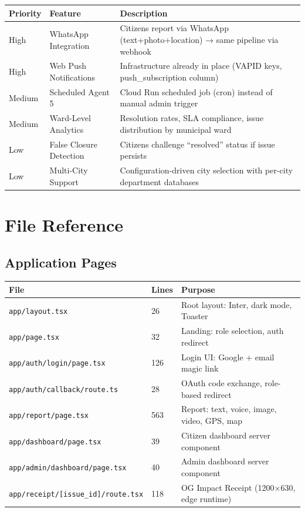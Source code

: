 \documentclass[11pt,a4paper]{article}
\newcommand{\thead}[1]{{\color{white}\bfseries\sffamily #1}}
\newcommand{\file}[1]{\texttt{\footnotesize\color{cpgray}#1}}
\begin{document}
\begin{tabular}{@{} L{2cm} L{4cm} L{8cm} @{}}
\toprule
{}
\thead{Priority} & \thead{Feature} & \thead{Description} \\
\midrule
High   & WhatsApp Integration      & Citizens report via WhatsApp (text+photo+location) → same pipeline via webhook \\
High   & Web Push Notifications    & Infrastructure already in place (VAPID keys, push\_subscription column) \\
Medium & Scheduled Agent 5         & Cloud Run scheduled job (cron) instead of manual admin trigger \\
Medium & Ward-Level Analytics      & Resolution rates, SLA compliance, issue distribution by municipal ward \\
Low    & False Closure Detection   & Citizens challenge ``resolved'' status if issue persists \\
Low    & Multi-City Support        & Configuration-driven city selection with per-city department databases \\
\bottomrule
\end{tabular}

\clearpage

\section{File Reference}
\label{sec:files}

\subsection{Application Pages}

\begin{tabular}{@{} L{6cm} C{1cm} L{7cm} @{}}
\toprule
{}
\thead{File} & \thead{Lines} & \thead{Purpose} \\
\midrule
\file{app/layout.tsx}                        & 26  & Root layout: Inter, dark mode, Toaster \\
\file{app/page.tsx}                          & 32  & Landing: role selection, auth redirect \\
\file{app/auth/login/page.tsx}               & 126 & Login UI: Google + email magic link \\
\file{app/auth/callback/route.ts}            & 28  & OAuth code exchange, role-based redirect \\
\file{app/report/page.tsx}                   & 563 & Report: text, voice, image, video, GPS, map \\
\file{app/dashboard/page.tsx}                & 39  & Citizen dashboard server component \\
\file{app/admin/dashboard/page.tsx}          & 40  & Admin dashboard server component \\
\file{app/receipt/[issue\_id]/route.tsx}     & 118 & OG Impact Receipt (1200×630, edge runtime) \\
\bottomrule
\end{tabular}
\end{document}
